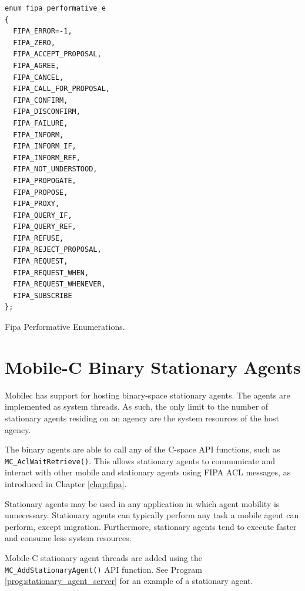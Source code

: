 \documentclass[11pt]{report}
\begin{document}
\begin{Program}[!t]
\begin{center}
   {\footnotesize \linespread{1.0} 
\begin{verbatim}
enum fipa_performative_e
{
  FIPA_ERROR=-1,
  FIPA_ZERO,
  FIPA_ACCEPT_PROPOSAL,
  FIPA_AGREE,
  FIPA_CANCEL,
  FIPA_CALL_FOR_PROPOSAL,
  FIPA_CONFIRM,
  FIPA_DISCONFIRM,
  FIPA_FAILURE,
  FIPA_INFORM,
  FIPA_INFORM_IF,
  FIPA_INFORM_REF,
  FIPA_NOT_UNDERSTOOD,
  FIPA_PROPOGATE,
  FIPA_PROPOSE,
  FIPA_PROXY,
  FIPA_QUERY_IF,
  FIPA_QUERY_REF,
  FIPA_REFUSE,
  FIPA_REJECT_PROPOSAL,
  FIPA_REQUEST,
  FIPA_REQUEST_WHEN,
  FIPA_REQUEST_WHENEVER,
  FIPA_SUBSCRIBE
};
\end{verbatim}
   }
\end{center}
\caption{Fipa Performative Enumerations.}
\label{prog:fipa_enum}
\end{Program}

\pagebreak
\clearpage
\pagebreak


\chapter{Mobile-C Binary Stationary Agents \label{chap:stationary_agent}}
Mobilec has support for hosting binary-space stationary agents. The
agents are implemented as system threads. As such, the only limit 
to the number of stationary agents residing on an agency are the
system resources of the host agency. 

The binary agents are able to call any of the C-space API functions, such as
\texttt{MC\_AclWaitRetrieve()}. This allows stationary agents to communicate
and interact with other mobile and stationary agents using FIPA ACL messages,
as introduced in Chapter \ref{chap:fipa}.

Stationary agents may be used in any application in which agent mobility is
unnecessary. Stationary agents can typically perform any task a mobile agent
can perform, except migration. Furthermore, stationary agents tend to execute
faster and consume less system resources.

Mobile-C stationary agent threads are added using the
\texttt{MC\_AddStationaryAgent()} API function. See Program 
\ref{prog:stationary_agent_server} for an example of a stationary agent. 
\end{document}
